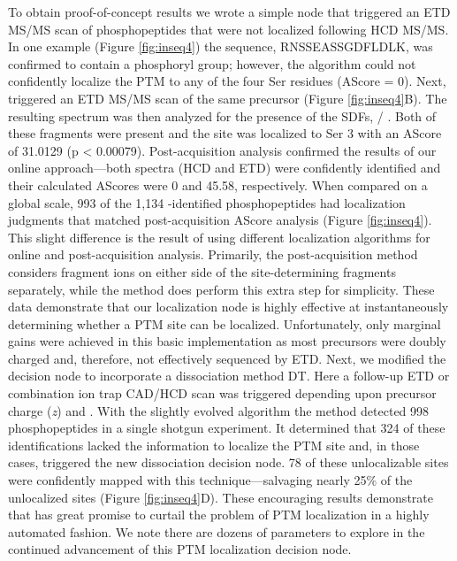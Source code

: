 To obtain proof-of-concept results we wrote a simple \inseq{} node that triggered an ETD MS/MS scan of phosphopeptides that were not localized following HCD MS/MS. In one example (Figure \ref{fig:inseq4}) the sequence, RNSSEASSGDFLDLK, was confirmed to contain a phosphoryl group; however, the \inseq{} algorithm could not confidently localize the PTM to any of the four Ser residues (AScore = 0). Next, \inseq{} triggered an ETD MS/MS scan of the same precursor (Figure \ref{fig:inseq4}B). The resulting spectrum was then analyzed for the presence of the SDFs,  / . Both of these fragments were present and the site was localized to Ser 3 with an AScore of 31.0129 (p < 0.00079). Post-acquisition analysis confirmed the results of our online \inseq{} approach---both spectra (HCD and ETD) were confidently identified and their calculated AScores were 0 and 45.58, respectively. When compared on a global scale, 993 of the 1,134 \inseq{}-identified phosphopeptides had localization judgments that matched post-acquisition AScore analysis (Figure \ref{fig:inseq4}). This slight difference is the result of using different localization algorithms for online and post-acquisition analysis. Primarily, the post-acquisition method considers fragment ions on either side of the site-determining fragments separately, while the \inseq{} method does perform this extra step for simplicity.\cite{esips,ascore} These data demonstrate that our localization node is highly effective at instantaneously determining whether a PTM site can be localized. Unfortunately, only marginal gains were achieved in this basic implementation as most precursors were doubly charged and, therefore, not effectively sequenced by ETD. Next, we modified the \inseq{} decision node to incorporate a dissociation method DT. Here a follow-up ETD or combination ion trap CAD/HCD scan was triggered depending upon precursor charge (\textit{z}) and \mz{}. With the slightly evolved algorithm the \inseq{} method detected 998 phosphopeptides in a single shotgun experiment. It determined that 324 of these identifications lacked the information to localize the PTM site and, in those cases, triggered the new dissociation decision node. 78 of these unlocalizable sites were confidently mapped with this technique---salvaging nearly 25\% of the unlocalized sites (Figure \ref{fig:inseq4}D). These encouraging results demonstrate that \inseq{} has great promise to curtail the problem of PTM localization in a highly automated fashion. We note there are dozens of parameters to explore in the continued advancement of this PTM localization decision node.

